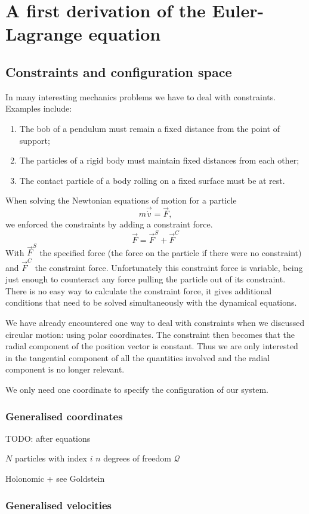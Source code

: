 \chapter{A first derivation of the Euler-Lagrange equation}
\section{Constraints and configuration space}
In many interesting mechanics problems we have to deal with constraints. Examples include:
\begin{enumerate}
\item The bob of a pendulum must remain a fixed distance from the point of support;
\item The particles of a rigid body must maintain fixed distances from each other;
\item The contact particle of a body rolling on a fixed surface must be at rest.
\end{enumerate}
When solving the Newtonian equations of motion for a particle
\[ m \vec{\dot{v}} = \vec{F}, \]
we enforced the constraints by adding a constraint force.
\[ \vec{F} = \vec{F}^S + \vec{F}^C \]
With $\vec{F}^S$ the specified force (the force on the particle if there were no constraint) and $\vec{F}^C$ the constraint force.
Unfortunately this constraint force is variable, being just enough to counteract any force pulling the particle out of its constraint. There is no easy way to calculate the constraint force, it gives additional conditions that need to be solved simultaneously with the dynamical equations.

We have already encountered one way to deal with constraints when we discussed circular motion: using polar coordinates. The constraint then becomes that the radial component of the position vector is constant. Thus we are only interested in the tangential component of all the quantities involved and the radial component is no longer relevant. 

We only need one coordinate to specify the configuration of our system. 

\subsection{Generalised coordinates}
TODO: after equations

$N$ particles with index $i$
$n$ degrees of freedom
$\mathcal{Q}$

Holonomic + see Goldstein
\subsection{Generalised velocities}

